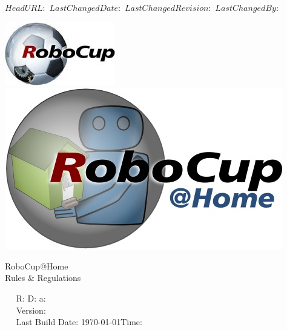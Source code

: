 \svnidlong
{$HeadURL: $}
{$LastChangedDate: $}
{$LastChangedRevision: $}
{$LastChangedBy: $}

\begin{titlepage}
  \begin{center}
    {
      \includegraphics[width=.25\textwidth]{images/logo_RoboCupFed.jpg}
      \hfill
      \includegraphics[width=.25\textwidth]{images/logo_RoboCupAtHome.jpg}\\[1.23ex]
    }
    \vspace{2.7 cm}
    \hrulefill\par
    {%
      \vspace*{.27cm}
      \Huge{RoboCup@Home}\\[1.23ex]
      \Large Rules \& Regulations \\[2ex]
    }
    \hrulefill\par
    \vfill
    ~~ R: \svnrev D: \svndate a:  ~~\\
    ~~ Version: \YEAR \quad \svnRevision ~~ \\
    ~~ Last Build Date: \today \quad Time: \the\time ~~ \\
    ~~ \svnChangeData ~~ %
  \end{center}
\end{titlepage}
